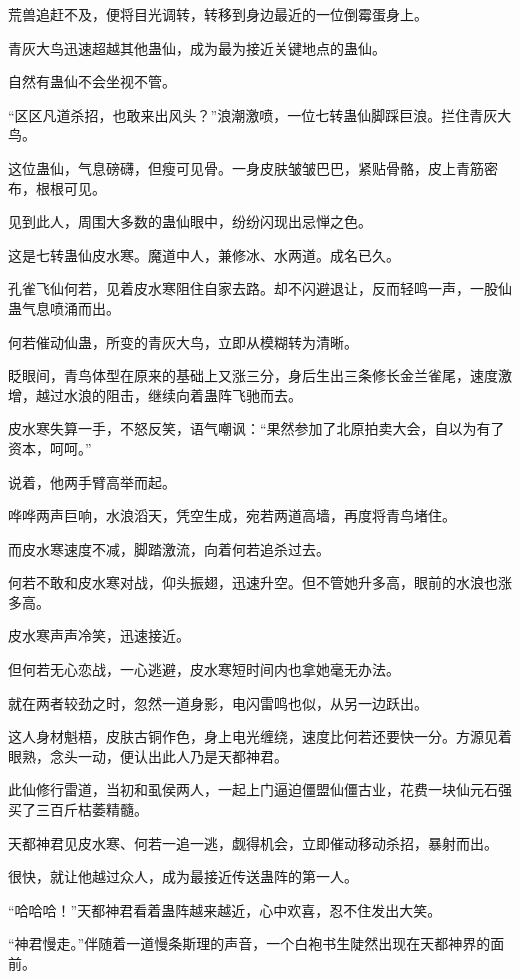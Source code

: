 \begin{this_body}
荒兽追赶不及，便将目光调转，转移到身边最近的一位倒霉蛋身上。

青灰大鸟迅速超越其他蛊仙，成为最为接近关键地点的蛊仙。

自然有蛊仙不会坐视不管。

“区区凡道杀招，也敢来出风头？”浪潮激喷，一位七转蛊仙脚踩巨浪。拦住青灰大鸟。

这位蛊仙，气息磅礴，但瘦可见骨。一身皮肤皱皱巴巴，紧贴骨骼，皮上青筋密布，根根可见。

见到此人，周围大多数的蛊仙眼中，纷纷闪现出忌惮之色。

这是七转蛊仙皮水寒。魔道中人，兼修冰、水两道。成名已久。

孔雀飞仙何若，见着皮水寒阻住自家去路。却不闪避退让，反而轻鸣一声，一股仙蛊气息喷涌而出。

何若催动仙蛊，所变的青灰大鸟，立即从模糊转为清晰。

眨眼间，青鸟体型在原来的基础上又涨三分，身后生出三条修长金兰雀尾，速度激增，越过水浪的阻击，继续向着蛊阵飞驰而去。

皮水寒失算一手，不怒反笑，语气嘲讽：“果然参加了北原拍卖大会，自以为有了资本，呵呵。”

说着，他两手臂高举而起。

哗哗两声巨响，水浪滔天，凭空生成，宛若两道高墙，再度将青鸟堵住。

而皮水寒速度不减，脚踏激流，向着何若追杀过去。

何若不敢和皮水寒对战，仰头振翅，迅速升空。但不管她升多高，眼前的水浪也涨多高。

皮水寒声声冷笑，迅速接近。

但何若无心恋战，一心逃避，皮水寒短时间内也拿她毫无办法。

就在两者较劲之时，忽然一道身影，电闪雷鸣也似，从另一边跃出。

这人身材魁梧，皮肤古铜作色，身上电光缠绕，速度比何若还要快一分。方源见着眼熟，念头一动，便认出此人乃是天都神君。

此仙修行雷道，当初和虱侯两人，一起上门逼迫僵盟仙僵古业，花费一块仙元石强买了三百斤枯萎精髓。

天都神君见皮水寒、何若一追一逃，觑得机会，立即催动移动杀招，暴射而出。

很快，就让他越过众人，成为最接近传送蛊阵的第一人。

“哈哈哈！”天都神君看着蛊阵越来越近，心中欢喜，忍不住发出大笑。

“神君慢走。”伴随着一道慢条斯理的声音，一个白袍书生陡然出现在天都神界的面前。


\end{this_body}
